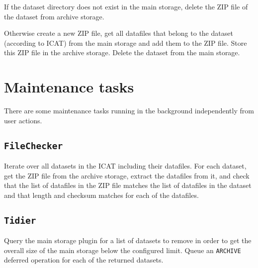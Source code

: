 \documentclass[paper=a4]{scrartcl}
\begin{document}
If the dataset directory does not exist in the main storage, delete
the ZIP file of the dataset from archive storage.

Otherwise create a new ZIP file, get all datafiles that belong to the
dataset (according to ICAT) from the main storage and add them to the
ZIP file.  Store this ZIP file in the archive storage.  Delete the
dataset from the main storage.


\section{Maintenance tasks}
\label{sec:maintenance}

There are some maintenance tasks running in the background
independently from user actions.

\subsection{\texttt{FileChecker}}

Iterate over all datasets in the ICAT including their datafiles.  For
each dataset, get the ZIP file from the archive storage, extract the
datafiles from it, and check that the list of datafiles in the ZIP
file matches the list of datafiles in the dataset and that length and
checksum matches for each of the datafiles.

\subsection{\texttt{Tidier}}

Query the main storage plugin for a list of datasets to remove in
order to get the overall size of the main storage below the configured
limit.  Queue an \texttt{ARCHIVE} deferred operation for each of the
returned datasets.
\end{document}
